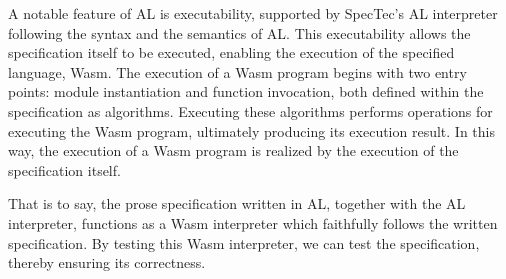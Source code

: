 A notable feature of AL is executability, supported by SpecTec's AL interpreter
following the syntax and the semantics of AL.
This executability allows the specification itself to be executed, enabling the
execution of the specified language, Wasm.
The execution of a Wasm program begins with two entry points: module
instantiation and function invocation, both defined within the specification as
algorithms.
Executing these algorithms performs operations for executing the Wasm program,
ultimately producing its execution result.
In this way, the execution of a Wasm program is realized by the execution of
the specification itself.


That is to say, the prose specification written in AL, together with the AL
interpreter, functions as a Wasm interpreter which faithfully follows the
written specification.
By testing this Wasm interpreter, we can test the specification, thereby
ensuring its correctness.
